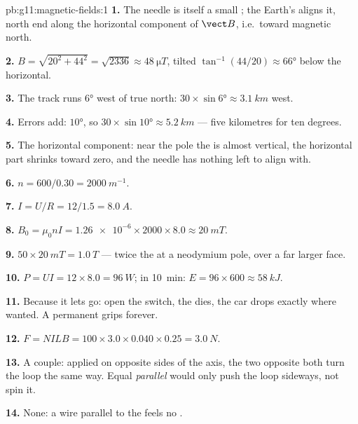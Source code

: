\begin{solution}{pb:g11:magnetic-fields:1}
\textbf{1.} The needle is itself a small ; the Earth's 
aligns it, north end along the horizontal component of $\vect B$,
i.e.\ toward magnetic north.

\textbf{2.} $B = \sqrt{20^2 + 44^2} = \sqrt{2336} \approx
\qty{48}{\micro T}$, tilted $\tan^{-1}(44/20) \approx \ang{66}$ below
the horizontal.

\textbf{3.} The track runs $\ang{6}$ west of true north:
$30 \times \sin\ang{6} \approx \qty{3.1}{km}$ west.

\textbf{4.} Errors add: $\ang{10}$, so $30 \times \sin\ang{10} \approx
\qty{5.2}{km}$ --- five kilometres for ten degrees.

\textbf{5.} The horizontal component: near the pole the  is
almost vertical, the horizontal part shrinks toward zero, and the
needle has nothing left to align with.

\textbf{6.} $n = 600/0.30 = \qty{2000}{m^{-1}}$.

\textbf{7.} $I = U/R = 12/1.5 = \qty{8.0}{A}$.

\textbf{8.} $B_0 = \mu_0 n I = \num{1.26e-6} \times 2000 \times 8.0
\approx \qty{20}{mT}$.

\textbf{9.} $50 \times \qty{20}{mT} = \qty{1.0}{T}$ --- twice the
 at a neodymium pole, over a far larger face.

\textbf{10.} $P = UI = 12 \times 8.0 = \qty{96}{W}$; in
\qty{10}{\minute}: $E = 96 \times 600 \approx \qty{58}{kJ}$.

\textbf{11.} Because it lets go: open the switch, the  dies, the
car drops exactly where wanted. A permanent  grips forever.

\textbf{12.} $F = NILB = 100 \times 3.0 \times 0.040 \times 0.25 =
\qty{3.0}{N}$.

\textbf{13.} A couple: applied on opposite sides of the axis, the two
opposite  both turn the loop the same way. Equal \emph{parallel}
 would only push the loop sideways, not spin it.

\textbf{14.} None: a wire parallel to the  feels no .


\end{solution}
